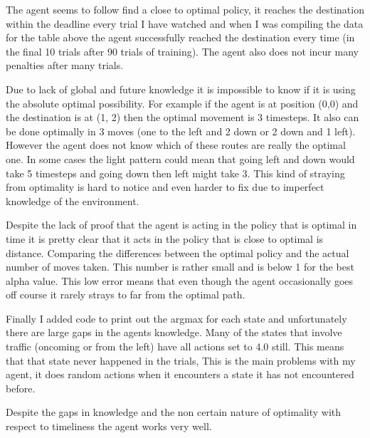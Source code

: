 \documentclass{article}
\begin{document}
The agent seems to follow find a close to optimal policy, it reaches the destination within the deadline every trial I have watched and when I was compiling the data for the table above the agent successfully reached the destination every time (in the final 10 trials after 90 trials of training). The agent also does not incur many penalties after many trials.

Due to lack of global and future knowledge it is impossible to know if it is using the absolute optimal possibility. For example if the agent is at position (0,0) and the destination is at (1, 2) then the optimal movement is 3 timesteps. It also can be done optimally in 3 moves (one to the left and 2 down or 2 down and 1 left). However the agent does not know which of these routes are really the optimal one. In some cases the light pattern could mean that going left and down would take 5 timesteps and going down then left might take 3. This kind of straying from optimality is hard to notice and even harder to fix due to imperfect knowledge of the environment.

Despite the lack of proof that the agent is acting in the policy that is optimal in time it is pretty clear that it acts in the policy that is close to optimal is distance. Comparing the differences between the optimal policy and the actual number of moves taken. This number is rather small and is below 1 for the best alpha value. This low error means that even though the agent occasionally goes off course it rarely strays to far from the optimal path.

Finally I added code to print out the argmax for each state and unfortunately there are large gaps in the agents knowledge. Many of the states that involve traffic (oncoming or from the left) have all actions set to 4.0 still. This means that that state never happened in the trials, This is the main problems with my agent, it does random actions when it encounters a state it has not encountered before.

Despite the gaps in knowledge and the non certain nature of optimality with respect to timeliness the agent works very well.
\end{document}
